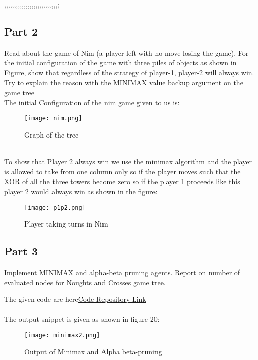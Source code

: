 ,,,,,,,,,,,,,,,,,,,,,,,,,,,;\documentclass[conference]{IEEEtran}
\begin{document}
\subsection{Part 2}
Read about the game of Nim (a player left with no move losing the game). For the initial configuration of the game with three piles of objects as shown in Figure, show that regardless of the strategy of player-1, player-2 will always win. Try to explain the reason with the MINIMAX value backup argument on the game tree
\\
The initial Configuration of the nim game given to us is:
\begin{figure}[htbp]
\centerline{\texttt{[image: nim.png]}}
\caption{Graph of the tree}
\label{fig}
\end{figure}
\\
To show that Player 2 always win we use the minimax algorithm and the player is allowed to take from one column only so if the player moves such that the XOR of all the three towers become zero\cite{b9} so if the player 1 proceeds like this player 2 would always win as shown in the figure:
\\
\begin{figure}[htbp]
\centerline{\texttt{[image: p1p2.png]}}
\caption{Player taking turns in Nim}
\label{fig}
\end{figure}

\subsection{Part 3}
Implement MINIMAX and alpha-beta pruning agents. Report on number of evaluated nodes for Noughts and Crosses
game tree.\cite{b5}

The given code are here\href{https://github.com/darshh311/CS362_lab}{Code Repository Link}
\\
\\
The output snippet is given as shown in figure 20:
\begin{figure}[htbp]
\centerline{\texttt{[image: minimax2.png]}}
\caption{Output of Minimax and Alpha beta-pruning}
\label{fig}
\end{figure}
\end{document}
